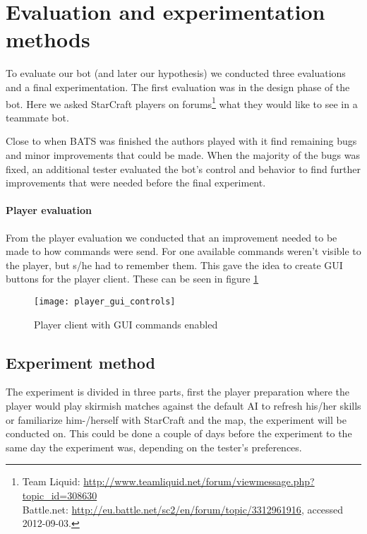 \section{Evaluation and experimentation methods}
To evaluate our bot (and later our hypothesis) we conducted three evaluations and a final experimentation. The first evaluation was in the design phase of the bot. Here we asked StarCraft players on forums\footnote{
Team Liquid: \url{http://www.teamliquid.net/forum/viewmessage.php?topic_id=308630}\\
Battle.net: \url{http://eu.battle.net/sc2/en/forum/topic/3312961916}, accessed 2012-09-03.} what they would like to see in a teammate bot.

Close to when BATS was finished the authors played with it find remaining bugs and minor improvements that could be made. When the majority of the bugs was fixed, an additional tester evaluated the bot’s control and behavior to find further improvements that were needed before the final experiment.

\paragraph{Player evaluation}
From the player evaluation we conducted that an improvement needed to be made to how commands were send. For one available commands weren’t visible to the player, but s/he had to remember them. This gave the idea to create GUI buttons for the player client. These can be seen in figure \ref{fig:player_commands_gui}

\begin{figure}[htb]
\centering
\texttt{[image: player\_gui\_controls]}
\caption{Player client with GUI commands enabled}
\label{fig:player_commands_gui}
\end{figure}

\subsection{Experiment method}
The experiment is divided in three parts, first the player preparation where the player would play skirmish matches against the default AI to refresh his/her skills or familiarize him-/herself with StarCraft and the map, the experiment will be conducted on. This could be done a couple of days before the experiment to the same day the experiment was, depending on the tester’s preferences.

